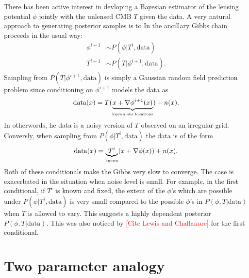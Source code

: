 \documentclass[noinfoline]{imsart}
\begin{document}
There has been active interest in devloping a Bayesian estimator of the lensing potential $\phi$ jointly with the unlensed CMB $T$ given the data. A very natural approach to generating posterior samples is to 
In the ancillary Gibbs chain proceeds in the usual way:
\begin{align}
\phi^{i+1}&\sim P(\phi | T^{i},  \text{data})\\
T^{i+1}&\sim P(T |  \phi^{i+1},\text{data}).
\end{align}
Sampling from $P(T |  \phi^{i+1},\text{data})$ is simply a Gaussian random field prediction problem since conditioning on $\phi^{i+1}$ models the data as
\[ \text{data}(x) = T(\underbrace{x+\nabla\phi^{i+1}(x)}_\text{\tiny known obs locations}) + n(x).\]
In otherwords, he data is a noisy version of  $T$ observed on an irregular grid. 
Conversly, when sampling from $P(\phi |  T^{i},\text{data})$ the data is of the form
\[ \text{data}(x) = \underbrace{T^{i}}_{\text{\tiny known}}(x+\nabla\phi(x)) + n(x). \]
Both of these conditionals make the Gibbs very slow to converge. The case is exacerbated in the situation when noise level is small. For example, in the first conditional, if $T^{i}$ is known and fixed, the extent of the  $\phi$'s which are possible under $P(\phi|T^{i},\text{data})$  is very small compared to the possible $\phi$'s  in $P(\phi, T| \text{data})$ when $T$ is allowed to vary. 
This suggests a highly dependent posterior $P(\phi, T| \text{data})$. 
This was also noticed by \textcolor{red}{[Cite Lewis and Challanore]} for the first conditional.

%
%
\section{Two parameter analogy}
\label{two parameter system}
\end{document}
